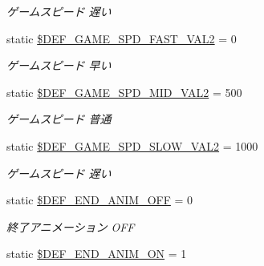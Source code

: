 \begin{DoxyCompactItemize}
\begin{DoxyCompactList}\small\item\em ゲームスピード 遅い \end{DoxyCompactList}\item 
static \hyperlink{class_reversi_const_a6fa812c8bbe57a64fd92223fd3b71086}{\$\+D\+E\+F\+\_\+\+G\+A\+M\+E\+\_\+\+S\+P\+D\+\_\+\+F\+A\+S\+T\+\_\+\+V\+A\+L2} = 0\hypertarget{class_reversi_const_a6fa812c8bbe57a64fd92223fd3b71086}{}\label{class_reversi_const_a6fa812c8bbe57a64fd92223fd3b71086}

\begin{DoxyCompactList}\small\item\em ゲームスピード 早い \end{DoxyCompactList}\item 
static \hyperlink{class_reversi_const_a016bb70e8fca576083b82f70c5abf022}{\$\+D\+E\+F\+\_\+\+G\+A\+M\+E\+\_\+\+S\+P\+D\+\_\+\+M\+I\+D\+\_\+\+V\+A\+L2} = 500\hypertarget{class_reversi_const_a016bb70e8fca576083b82f70c5abf022}{}\label{class_reversi_const_a016bb70e8fca576083b82f70c5abf022}

\begin{DoxyCompactList}\small\item\em ゲームスピード 普通 \end{DoxyCompactList}\item 
static \hyperlink{class_reversi_const_a6742adf1a0780356fd92b8a18c1710c8}{\$\+D\+E\+F\+\_\+\+G\+A\+M\+E\+\_\+\+S\+P\+D\+\_\+\+S\+L\+O\+W\+\_\+\+V\+A\+L2} = 1000\hypertarget{class_reversi_const_a6742adf1a0780356fd92b8a18c1710c8}{}\label{class_reversi_const_a6742adf1a0780356fd92b8a18c1710c8}

\begin{DoxyCompactList}\small\item\em ゲームスピード 遅い \end{DoxyCompactList}\item 
static \hyperlink{class_reversi_const_a61944ae88b15f2b7a1e0fafa6427b1d9}{\$\+D\+E\+F\+\_\+\+E\+N\+D\+\_\+\+A\+N\+I\+M\+\_\+\+O\+FF} = 0\hypertarget{class_reversi_const_a61944ae88b15f2b7a1e0fafa6427b1d9}{}\label{class_reversi_const_a61944ae88b15f2b7a1e0fafa6427b1d9}

\begin{DoxyCompactList}\small\item\em 終了アニメーション O\+FF \end{DoxyCompactList}\item 
static \hyperlink{class_reversi_const_ad0da61a2d5650bdefb8db60d69d686ed}{\$\+D\+E\+F\+\_\+\+E\+N\+D\+\_\+\+A\+N\+I\+M\+\_\+\+ON} = 1\hypertarget{class_reversi_const_ad0da61a2d5650bdefb8db60d69d686ed}{}\label{class_reversi_const_ad0da61a2d5650bdefb8db60d69d686ed}


\end{DoxyCompactItemize}
